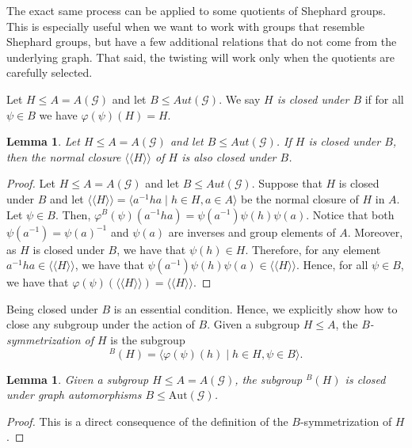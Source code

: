 \documentclass[11pt,letterpaper]{amsart}
\newtheorem{lemma}[prop]{Lemma}
\newcommand{\GG}{\mathcal{G}}
\newcommand{\Aut}{\mathrm{Aut}}
\begin{document}
The exact same process can be applied to some quotients of Shephard groups. This is especially useful when we want to work with groups that resemble Shephard groups, but have a few additional relations that do not come from the underlying graph. That said, the twisting will work only when the quotients are carefully selected.

Let $H\leq A =A(\GG)$ and let $B\leq Aut(\GG)$. We say \emph{$H$ is closed under $B$} if for all $\psi\in B$ we have $\varphi(\psi)(H)= H$.



\begin{lemma}\label{lem:normalclosureClosedUnderGraphAut}
    Let $H\leq A =A(\GG)$ and let $B\leq Aut(\GG)$.
    If $H$ is closed under $B$, then the normal closure $\langle\langle H\rangle\rangle$ of $H$ is also closed under $B$.
\end{lemma}
\begin{proof}
    Let $H\leq A =A(\GG)$ and let $B\leq Aut(\GG)$.
    Suppose that $H$ is closed under $B$ and let $\langle\langle H\rangle\rangle = \langle a^{-1}ha \mid h\in H, a\in A\rangle$ be the normal closure of $H$ in $A$.
    Let $\psi\in B$. Then, $\varphi^B(\psi)(a^{-1}ha)=\psi(a^{-1})\psi(h)\psi(a)$.
    Notice that both $\psi(a^{-1})=\psi(a)^{-1}$ and $\psi(a)$ are inverses and group elements of $A$. Moreover, as $H$ is closed under $B$, we have that $\psi(h)\in H$. Therefore, for any element $a^{-1}ha\in \langle\langle H\rangle\rangle$, we have that $\psi(a^{-1})\psi(h)\psi(a)\in \langle\langle H\rangle\rangle$.
    Hence, for all $\psi\in B$, we have that $\varphi(\psi)(\langle\langle H\rangle\rangle)=\langle\langle H\rangle\rangle$.
\end{proof}


Being closed under $B$ is an essential condition. Hence, we explicitly show how to close any subgroup under the action of $B$. Given a subgroup $H\leq A$, the \emph{$B$-symmetrization of $H$} is the subgroup $$^B(H)= \langle\varphi(\psi)(h)\mid h\in H, \psi\in B \rangle.$$


\begin{lemma}\label{lem:B-symmHClosed}
    Given a subgroup $H\leq A=A(\GG)$, the subgroup $^B(H)$ is closed under graph automorphisms $B\leq \Aut(\GG)$.
\end{lemma}
\begin{proof}
    This is a direct consequence of the definition of the $B$-symmetrization of $H$.
\end{proof}
\end{document}
